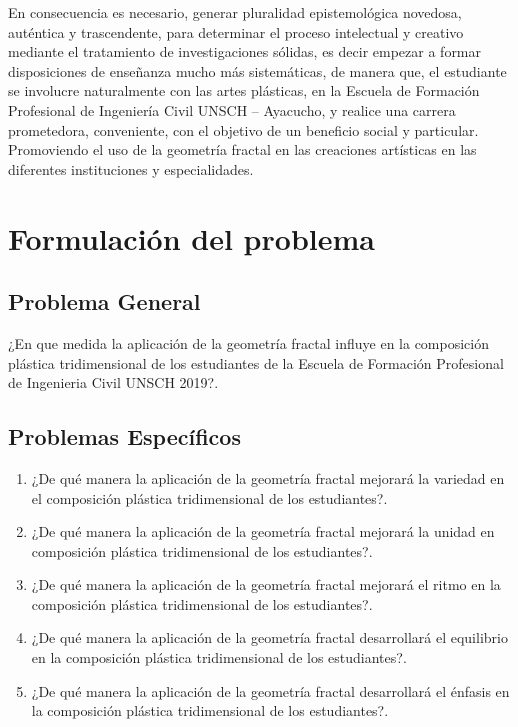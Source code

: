 \documentclass[12pt,]{report}
\begin{document}
En consecuencia es necesario, generar pluralidad epistemológica novedosa, auténtica
y trascendente, para determinar el proceso intelectual y creativo mediante el tratamiento
de investigaciones sólidas, es decir empezar a formar disposiciones de enseñanza mucho
más sistemáticas, de manera que, el estudiante se involucre naturalmente con las artes
plásticas, en la Escuela de Formación Profesional de Ingeniería Civil UNSCH -- Ayacucho,
y realice una carrera prometedora, conveniente, con el objetivo de un beneficio
social y particular. Promoviendo el uso de la geometría fractal en las creaciones artísticas
en las diferentes instituciones y especialidades.

\hypertarget{formulaciuxf3n-del-problema}{%
\section{Formulación del problema}\label{formulaciuxf3n-del-problema}}

\hypertarget{problema-general}{%
\subsection{Problema General}\label{problema-general}}

¿En que medida la aplicación de la geometría fractal influye en la composición plástica
tridimensional de los estudiantes de la Escuela de Formación Profesional de Ingenieria
Civil UNSCH 2019?.

\hypertarget{problemas-especuxedficos}{%
\subsection{Problemas Específicos}\label{problemas-especuxedficos}}

\begin{enumerate}
\def\labelenumi{\arabic{enumi}.}
\item
  ¿De qué manera la aplicación de la geometría fractal mejorará la variedad en el
  composición plástica tridimensional de los estudiantes?.
\item
  ¿De qué manera la aplicación de la geometría fractal mejorará la unidad en composición
  plástica tridimensional de los estudiantes?.
\item
  ¿De qué manera la aplicación de la geometría fractal mejorará el ritmo en la composición
  plástica tridimensional de los estudiantes?.
\item
  ¿De qué manera la aplicación de la geometría fractal desarrollará el equilibrio en
  la composición plástica tridimensional de los estudiantes?.
\item
  ¿De qué manera la aplicación de la geometría fractal desarrollará el énfasis en la
  composición plástica tridimensional de los estudiantes?.
\end{enumerate}
\end{document}
